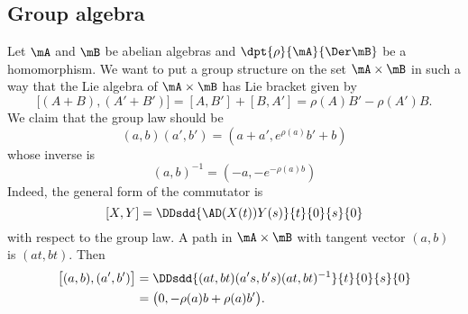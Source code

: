 \subsection{Group algebra}

Let $\mA$ and $\mB$ be abelian algebras and $\dpt{\rho}{\mA}{\Der\mB}$ be a homomorphism. We want to put a group structure on the set $\mA\times\mB$ in such a way that the Lie algebra of $\mA\times\mB$ has Lie bracket given by
\begin{equation}
	\big[ (A+B),(A'+B')  \big]=[A,B']+[B,A']=\rho(A)B'-\rho(A')B.
\end{equation}
We claim that the group law should be
\begin{equation}
	(a,b)(a',b')=(a+a',e^{\rho(a)}b'+b)
\end{equation}
whose inverse is
\begin{equation}
	(a,b)^{-1}=(-a,-e^{-\rho(a)b})
\end{equation}
Indeed, the general form of the commutator is
\[
	[X,Y]=\DDsdd{ \AD(X(t))Y(s) }{t}{0}{s}{0}
\]
with respect to the group law. A path in $\mA\times\mB$ with tangent vector $(a,b)$ is $(at,bt)$. Then
\begin{equation}
	\begin{split}
		\big[ (a,b),(a',b') \big]&=\DDsdd{ (at,bt)(a's,b's)(at,bt)^{-1} }{t}{0}{s}{0}\\
		&=\big(0,-\rho(a)b+\rho(a)b'\big).
	\end{split}
\end{equation}
